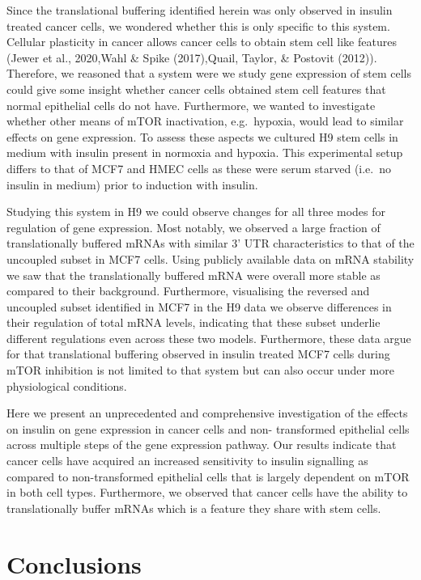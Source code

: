 \documentclass[12pt,openany]{book}
\begin{document}
Since the translational buffering identified herein was only observed in
insulin treated cancer cells, we wondered whether this is only specific
to this system. Cellular plasticity in cancer allows cancer cells to
obtain stem cell like features (Jewer et al., 2020,Wahl \& Spike
(2017),Quail, Taylor, \& Postovit (2012)). Therefore, we reasoned that a
system were we study gene expression of stem cells could give some
insight whether cancer cells obtained stem cell features that normal
epithelial cells do not have. Furthermore, we wanted to investigate
whether other means of mTOR inactivation, e.g.~hypoxia, would lead to
similar effects on gene expression. To assess these aspects we cultured
H9 stem cells in medium with insulin present in normoxia and hypoxia.
This experimental setup differs to that of MCF7 and HMEC cells as these
were serum starved (i.e.~no insulin in medium) prior to induction with
insulin.

Studying this system in H9 we could observe changes for all three modes
for regulation of gene expression. Most notably, we observed a large
fraction of translationally buffered mRNAs with similar 3' UTR
characteristics to that of the uncoupled subset in MCF7 cells. Using
publicly available data on mRNA stability we saw that the
translationally buffered mRNA were overall more stable as compared to
their background. Furthermore, visualising the reversed and uncoupled
subset identified in MCF7 in the H9 data we observe differences in their
regulation of total mRNA levels, indicating that these subset underlie
different regulations even across these two models. Furthermore, these
data argue for that translational buffering observed in insulin treated
MCF7 cells during mTOR inhibition is not limited to that system but can
also occur under more physiological conditions.

Here we present an unprecedented and comprehensive investigation of the
effects on insulin on gene expression in cancer cells and non-
transformed epithelial cells across multiple steps of the gene
expression pathway. Our results indicate that cancer cells have acquired
an increased sensitivity to insulin signalling as compared to
non-transformed epithelial cells that is largely dependent on mTOR in
both cell types. Furthermore, we observed that cancer cells have the
ability to translationally buffer mRNAs which is a feature they share
with stem cells.

\chapter{Conclusions}
\end{document}
